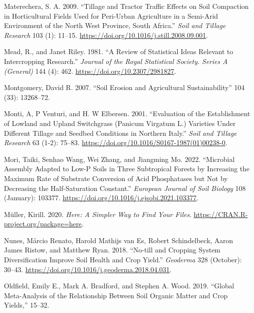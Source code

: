 \documentclass[
  12pt,
]{article}
\newlength{\cslhangindent}
\newlength{\cslentryspacingunit} %
\newenvironment{CSLReferences}[2] %
 {%
  \setlength{\parindent}{0pt}
  \ifodd #1
  \let\oldpar\par
  \def\par{\hangindent=\cslhangindent\oldpar}
  \fi
  \setlength{\parskip}{#2\cslentryspacingunit}
 }%
 {}
\begin{document}
\begin{CSLReferences}{1}{0}
\leavevmode{}%
Materechera, S. A. 2009. {``Tillage and Tractor Traffic Effects on Soil Compaction in Horticultural Fields Used for Peri-Urban Agriculture in a Semi-Arid Environment of the {North West Province}, {South Africa}.''} \emph{Soil and Tillage Research} 103 (1): 11--15. \url{https://doi.org/10.1016/j.still.2008.09.001}.

\leavevmode{}%
Mead, R., and Janet Riley. 1981. {``A {Review} of {Statistical Ideas Relevant} to {Intercropping Research}.''} \emph{Journal of the Royal Statistical Society. Series A (General)} 144 (4): 462. \url{https://doi.org/10.2307/2981827}.

\leavevmode{}%
Montgomery, David R. 2007. {``Soil Erosion and Agricultural Sustainability''} 104 (33): 13268--72.

\leavevmode{}%
Monti, A, P Venturi, and H. W Elbersen. 2001. {``Evaluation of the Establishment of Lowland and Upland Switchgrass ({Panicum} Virgatum {L}.) Varieties Under Different Tillage and Seedbed Conditions in Northern {Italy}.''} \emph{Soil and Tillage Research} 63 (1-2): 75--83. \url{https://doi.org/10.1016/S0167-1987(01)00238-0}.

\leavevmode{}%
Mori, Taiki, Senhao Wang, Wei Zhang, and Jiangming Mo. 2022. {``Microbial Assembly Adapted to Low-{P} Soils in Three Subtropical Forests by Increasing the Maximum Rate of Substrate Conversion of Acid Phosphatases but Not by Decreasing the Half-Saturation Constant.''} \emph{European Journal of Soil Biology} 108 (January): 103377. \url{https://doi.org/10.1016/j.ejsobi.2021.103377}.

\leavevmode{}%
Müller, Kirill. 2020. \emph{Here: A Simpler Way to Find Your Files}. \url{https://CRAN.R-project.org/package=here}.

\leavevmode{}%
Nunes, Márcio Renato, Harold Mathijs van Es, Robert Schindelbeck, Aaron James Ristow, and Matthew Ryan. 2018. {``No-till and Cropping System Diversification Improve Soil Health and Crop Yield.''} \emph{Geoderma} 328 (October): 30--43. \url{https://doi.org/10.1016/j.geoderma.2018.04.031}.

\leavevmode{}%
Oldfield, Emily E., Mark A. Bradford, and Stephen A. Wood. 2019. {``Global Meta-Analysis of the Relationship Between Soil Organic Matter and Crop Yields,''} 15--32.


\end{CSLReferences}
\end{document}
